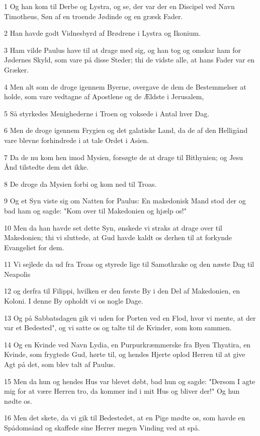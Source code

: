 \par 1 Og han kom til Derbe og Lystra, og se, der var der en Discipel ved Navn Timotheus, Søn af en troende Jødinde og en græsk Fader.
\par 2 Han havde godt Vidnesbyrd af Brødrene i Lystra og Ikonium.
\par 3 Ham vilde Paulus have til at drage med sig, og han tog og omskar ham for Jødernes Skyld, som vare på disse Steder; thi de vidste alle, at hans Fader var en Græker.
\par 4 Men alt som de droge igennem Byerne, overgave de dem de Bestemmelser at holde, som vare vedtagne af Apostlene og de Ældste i Jerusalem,
\par 5 Så styrkedes Menighederne i Troen og voksede i Antal hver Dag.
\par 6 Men de droge igennem Frygien og det galatiske Land, da de af den Helligånd vare blevne forhindrede i at tale Ordet i Asien.
\par 7 Da de nu kom hen imod Mysien, forsøgte de at drage til Bithynien; og Jesu Ånd tilstedte dem det ikke.
\par 8 De droge da Mysien forbi og kom ned til Troas.
\par 9 Og et Syn viste sig om Natten for Paulus: En makedonisk Mand stod der og bad ham og sagde: "Kom over til Makedonien og hjælp os!"
\par 10 Men da han havde set dette Syn, ønskede vi straks at drage over til Makedonien; thi vi sluttede, at Gud havde kaldt os derhen til at forkynde Evangeliet for dem.
\par 11 Vi sejlede da ud fra Troas og styrede lige til Samothrake og den næste Dag til Neapolis
\par 12 og derfra til Filippi, hvilken er den første By i den Del af Makedonien, en Koloni. I denne By opholdt vi os nogle Dage.
\par 13 Og på Sabbatsdagen gik vi uden for Porten ved en Flod, hvor vi mente, at der var et Bedested", og vi satte os og talte til de Kvinder, som kom sammen.
\par 14 Og en Kvinde ved Navn Lydia, en Purpurkræmmerske fra Byen Thyatira, en Kvinde, som frygtede Gud, hørte til, og hendes Hjerte oplod Herren til at give Agt på det, som blev talt af Paulus.
\par 15 Men da hun og hendes Hus var blevet døbt, bad hun og sagde: "Dersom I agte mig for at være Herren tro, da kommer ind i mit Hus og bliver der!" Og hun nødte os.
\par 16 Men det skete, da vi gik til Bedestedet, at en Pige mødte os, som havde en Spådomsånd og skaffede sine Herrer megen Vinding ved at spå.
